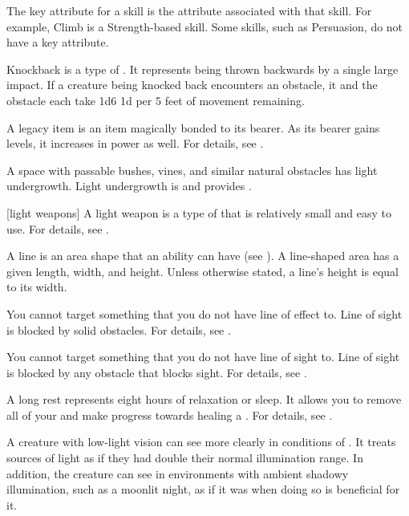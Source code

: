  The key attribute for a skill is the attribute associated with that skill.
For example, Climb is a Strength-based skill.
Some skills, such as Persuasion, do not have a key attribute.

 Knockback is a type of .
It represents being thrown backwards by a single large impact.
If a creature being knocked back encounters an obstacle, it and the obstacle each take 1d6  \add 1d per 5 feet of movement remaining.

 A legacy item is an item magically bonded to its bearer.
As its bearer gains levels, it increases in power as well.
For details, see .

 A space with passable bushes, vines, and similar natural obstacles has light undergrowth.
Light undergrowth is  and provides .

[light weapons] A light weapon is a type of  that is relatively small and easy to use.
For details, see .

 A line is an area shape that an ability can have (see ).
A line-shaped area has a given length, width, and height.
Unless otherwise stated, a line's height is equal to its width.

 You cannot target something that you do not have line of effect to.
Line of sight is blocked by solid obstacles.
For details, see .

 You cannot target something that you do not have line of sight to.
Line of sight is blocked by any obstacle that blocks sight.
For details, see .

 A long rest represents eight hours of relaxation or sleep.
It allows you to remove all of your  and make progress towards healing a .
For details, see .

 A creature with low-light vision can see more clearly in conditions of .
It treats sources of light as if they had double their normal illumination range.
In addition, the creature can see in environments with ambient shadowy illumination, such as a moonlit night, as if it was  when doing so is beneficial for it.


